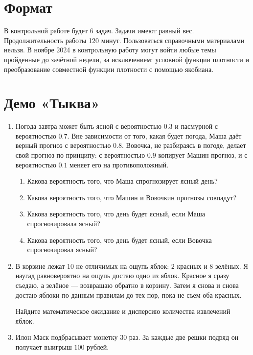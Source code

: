 \documentclass[12pt]{article}
\begin{document}
\section*{Формат}

В контрольной работе будет 6 задач. 
Задачи имеют равный вес. 
Продолжительность работы 120 минут. 
Пользоваться справочными материалами нельзя. 
В ноябре 2024 в контрольную работу могут войти любые темы пройденные до зачётной недели, за исключением: условной функции плотности и преобразование совместной функции плотности с помощью якобиана. 

\section*{Демо «Тыква»}
\begin{enumerate}
    \item %
    Погода завтра может быть ясной с вероятностью $0.3$ и пасмурной с вероятностью $0.7$. 
    Вне зависимости от того, какая будет погода, Маша даёт верный прогноз с вероятностью $0.8$. 
    Вовочка, не разбираясь в погоде, делает свой прогноз по принципу: с вероятностью $0.9$ копирует Машин прогноз, и с вероятностью $0.1$ меняет его на противоположный.
\begin{enumerate}
    \item Какова вероятность того, что Маша спрогнозирует ясный день?
    \item Какова вероятность того, что Машин и Вовочкин прогнозы совпадут?
    \item Какова вероятность того, что день будет ясный, если Маша спрогнозировала ясный?
    \item Какова вероятность того, что день будет ясный, если Вовочка спрогнозировал ясный?
\end{enumerate}
    \item %
    В корзине лежат 10 не отличимых на ощупь яблок: 2 красных и 8 зелёных. 
    Я наугад равновероятно на ощупь достаю одно из яблок.
    Красное я сразу съедаю, а зелёное — возвращаю обратно в корзину. 
    Затем я снова и снова достаю яблоки по данным правилам до тех пор, пока не съем оба красных. 

    Найдите математическое ожидание и дисперсию количества извлечений яблок. 
    
    \item %
    Илон Маск подбрасывает монетку 30 раз. 
    За каждые две решки подряд он получает выигрыш $100$ рублей. 


\end{enumerate}
\end{document}
